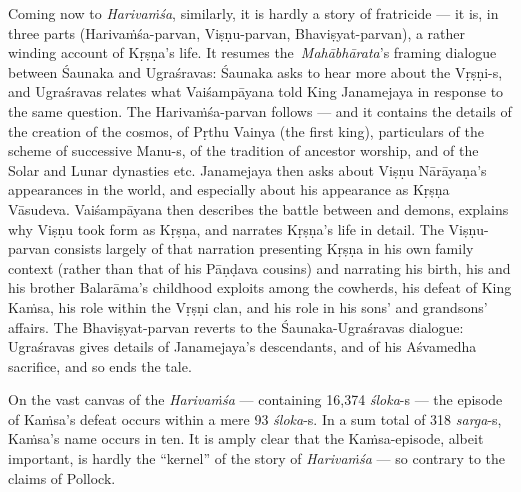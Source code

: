 Coming now to {\sl Harivaṁśa}, similarly, it is hardly a story of fratricide --- it is, in three parts (Harivaṁśa-parvan, Viṣṇu-parvan, Bhaviṣyat-parvan), a rather winding account of Kṛṣṇa’s life. It resumes the {\sl Mahābhārata}’s framing dialogue between Śaunaka and Ugraśravas: Śaunaka asks to hear more about the Vṛṣṇi-s, and Ugraśravas relates what Vaiśampāyana told King Janamejaya in response to the same question. The Harivaṁśa-parvan follows --- and it contains the details of the creation of the cosmos, of Pṛthu Vainya (the first king), particulars of the scheme of successive Manu-s, of the tradition of ancestor worship, and of the Solar and Lunar dynasties etc. Janamejaya then asks about Viṣṇu Nārāyaṇa’s appearances in the world, and especially about his appearance as Kṛṣṇa Vāsudeva. Vaiśampāyana then describes the battle between and demons, explains why Viṣṇu took form as Kṛṣṇa, and narrates Kṛṣṇa’s life in detail. The Viṣṇu-parvan consists largely of that narration presenting Kṛṣṇa in his own family context (rather than that of his Pāṇḍava cousins) and narrating his birth, his and his brother Balarāma’s childhood exploits among the cowherds, his defeat of King Kaṁsa, his role within the Vṛṣṇi clan, and his role in his sons’ and grandsons’ affairs. The Bhaviṣyat-parvan reverts to the Śaunaka-Ugraśravas dialogue: Ugraśravas gives details of Janamejaya’s descendants, and of his Aśvamedha sacrifice, and so ends the tale.
\vskip 1.3pt

On the vast canvas of the {\sl Harivaṁśa} --- containing 16,374 {\sl śloka}-s --- the episode of Kaṁsa’s defeat occurs within a mere 93 {\sl śloka}-s. In a sum total of 318 {\sl sarga}-s, Kaṁsa’s name occurs in ten. It is amply clear that the Kaṁsa-episode, albeit important, is hardly the “kernel” of the story of {\sl Harivaṁśa} --- so contrary to the claims of Pollock. 
\vskip 1.3pt

